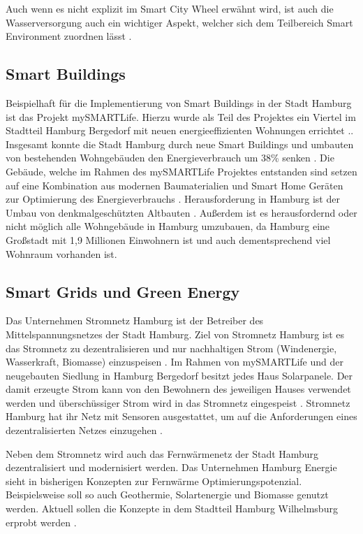 Auch wenn es nicht explizit im Smart City Wheel erwähnt wird, ist auch die Wasserversorgung auch ein wichtiger Aspekt, welcher sich dem Teilbereich Smart Environment zuordnen lässt \autocite[vgl.][]{Dickey.2018}.

\subsection{Smart Buildings}
Beispielhaft für die Implementierung von Smart Buildings in der Stadt Hamburg ist das Projekt mySMARTLife.
Hierzu wurde als Teil des Projektes ein Viertel im Stadtteil Hamburg Bergedorf mit neuen energieeffizienten Wohnungen errichtet \autocite[vgl.][S. 2ff.]{Hamburg.OD}..
Insgesamt konnte die Stadt Hamburg durch neue Smart Buildings und umbauten von bestehenden Wohngebäuden den Energieverbrauch um 38\% senken \autocite[vgl.][]{Hamburg.ODB}.
Die Gebäude, welche im Rahmen des mySMARTLife Projektes entstanden sind setzen auf eine Kombination aus modernen Baumaterialien und Smart Home Geräten zur Optimierung des Energieverbrauchs \autocite[vgl.][S. 2ff.]{Hamburg.OD}.
Herausforderung in Hamburg ist der Umbau von denkmalgeschützten Altbauten \autocite[vgl.][]{Hamburg.ODA}.
Außerdem ist es herausfordernd oder nicht möglich alle Wohngebäude in Hamburg umzubauen, da Hamburg eine Großstadt mit 1,9 Millionen Einwohnern ist und auch dementsprechend viel Wohnraum vorhanden ist.


\subsection{Smart Grids und Green Energy}
Das Unternehmen Stromnetz Hamburg ist der Betreiber des Mittelspannungsnetzes der Stadt Hamburg.
Ziel von Stromnetz Hamburg ist es das Stromnetz zu dezentralisieren und nur nachhaltigen Strom (Windenergie, Wasserkraft, Biomasse) einzuspeisen \autocite[vgl.][]{StromnetzHamburg.OD}.
Im Rahmen von mySMARTLife und der neugebauten Siedlung in Hamburg Bergedorf besitzt jedes Haus Solarpanele.
Der damit erzeugte Strom kann von den Bewohnern des jeweiligen Hauses verwendet werden und überschüssiger Strom wird in das Stromnetz eingespeist \autocite[vgl.][S. 9]{Hamburg.OD}.
Stromnetz Hamburg hat ihr Netz mit Sensoren ausgestattet, um auf die Anforderungen eines dezentralisierten Netzes einzugehen \autocite[vgl.][]{StromnetzHamburg.OD}.

Neben dem Stromnetz wird auch das Fernwärmenetz der Stadt Hamburg dezentralisiert und modernisiert werden.
Das Unternehmen Hamburg Energie sieht in bisherigen Konzepten zur Fernwärme Optimierungspotenzial.
Beispielsweise soll so auch Geothermie, Solartenergie und Biomasse genutzt werden.
Aktuell sollen die Konzepte in dem Stadtteil Hamburg Wilhelmsburg erprobt werden \autocite[][]{HamburgEnergie.OD}.

